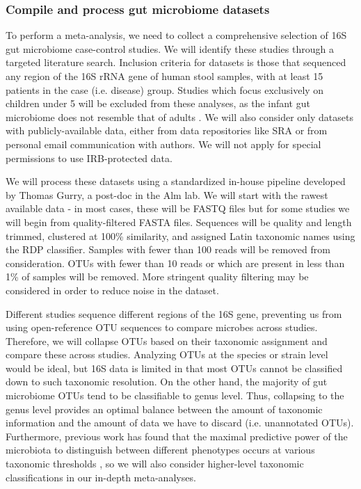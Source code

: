 \documentclass[12pt]{article}
\begin{document}
\subsubsection{Compile and process gut microbiome datasets}
To perform a meta-analysis, we need to collect a 
comprehensive selection of 16S gut microbiome case-control studies. We 
will identify these studies through a targeted literature search.  
Inclusion criteria for datasets is those that sequenced
any region of the 16S rRNA gene of human stool samples, with at least 15 patients in the
case (i.e. disease) group. Studies which focus exclusively on 
children under 5 will be excluded from these analyses, as the infant
gut microbiome does not resemble that of adults \cite{lozupone-meta-2013}.
We will also consider only datasets with 
publicly-available data, either from data repositories like SRA or
from personal email communication with authors. We will not 
apply for special permissions to use IRB-protected data. 

We will process these datasets using a standardized in-house pipeline 
developed by Thomas Gurry, a post-doc in the Alm lab. We will 
start with the rawest available data - in most cases, these will be 
FASTQ files but for some studies we will begin from quality-filtered 
FASTA files. Sequences will be quality and length trimmed, clustered 
at 100\% similarity, and assigned Latin taxonomic names using the RDP 
classifier. Samples with fewer than 100 reads will be removed from 
consideration. OTUs with fewer than 10 reads or which are present in 
less than 1\% of samples will be removed. More stringent quality 
filtering may be considered in order to reduce noise in the dataset.

Different studies sequence different regions of the 16S gene,
preventing us from using open-reference OTU sequences to compare
microbes across studies. Therefore, we will collapse OTUs
based on their taxonomic assignment and compare these across studies.
Analyzing OTUs at the species or strain level would be ideal,
but 16S data is limited in that most OTUs cannot be classified
down to such taxonomic resolution. On the other hand, the majority of gut microbiome
OTUs tend to be classifiable to genus level. Thus, collapsing to the genus level 
provides an optimal balance between the amount of taxonomic information and the 
amount of data we have to discard (i.e. unannotated OTUs).
Furthermore, previous work has found that the maximal predictive power of the microbiota
to distinguish between different phenotypes
occurs at various taxonomic thresholds \cite{knights-biomarkers-2011}, so we will
also consider higher-level taxonomic classifications in our in-depth meta-analyses.
\end{document}
